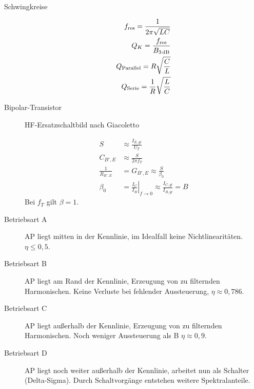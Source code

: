 \begin{description}
\item[Schwingkreise]
\begin{align*}
f_\text{res} = \frac{1}{2\pi \sqrt{LC}} \\
Q_K = \frac{f_\text{res}}{B_\text{\SI{3}{\dB}}} \\
Q_\text{Parallel} = R \sqrt{\frac{C}{L}}\\
Q_\text{Serie} = \frac{1}{R} \sqrt{\frac{L}{C}}
\end{align*}

\item[Bipolar-Transistor] HF-Ersatzschaltbild nach Giacoletto
\begin{center}
\begin{circuitikz}[scale=1.35, every node/.style={scale=1}]

\end{circuitikz}
\end{center}
\begin{align*}
S &\approx \frac{I_{E,gl}}{U_T}\\
C_{B',E} &\approx \frac{S}{2\pi f_T}\\
\frac{1}{R_{B',E}} &= G_{B',E} \approx \frac{S}{\beta_0}\\
\beta_0 &= \left.\frac{I_C}{I_B}\right\vert_{f \rightarrow 0} \approx \frac{I_{C,gl}}{I_{B,gl}} = B
\end{align*}
Bei $f_T$ gilt $\beta = 1$.

\item[Betriebsart A] AP liegt mitten in der Kennlinie, im Idealfall keine Nichtlinearitäten. $\eta \leq 0,5$.
\item[Betriebsart B] AP liegt am Rand der Kennlinie, Erzeugung von zu filternden Harmonischen. Keine Verluste bei fehlender Aussteuerung, $\eta \approx 0,786$.
\item[Betriebsart C] AP liegt außerhalb der Kennlinie, Erzeugung von zu filternden Harmonischen. Noch weniger Aussteuerung als B $\eta \approx 0,9$.
\item[Betriebsart D] AP liegt noch weiter außerhalb der Kennlinie, arbeitet nun als Schalter (Delta-Sigma). Durch Schaltvorgänge entstehen weitere Spektralanteile.


\end{description}
